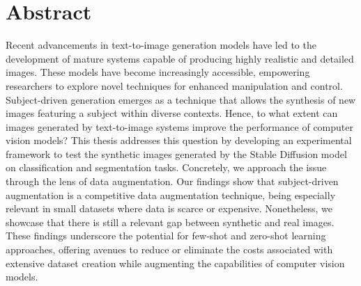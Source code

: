 \section*{Abstract}

Recent advancements in text-to-image generation models have led to the development of mature systems capable of producing highly realistic and detailed images. These models have become increasingly accessible, empowering researchers to explore novel techniques for enhanced manipulation and control. Subject-driven generation emerges as a technique that allows the synthesis of new images featuring a subject within diverse contexts. Hence, to what extent can images generated by text-to-image systems improve the performance of computer vision models? This thesis addresses this question by developing an experimental framework to test the synthetic images generated by the Stable Diffusion model on classification and segmentation tasks. Concretely, we approach the issue through the lens of data augmentation. Our findings show that subject-driven augmentation is a competitive data augmentation technique, being especially relevant in small datasets where data is scarce or expensive. Nonetheless, we showcase that there is still a relevant gap between synthetic and real images. These findings underscore the potential for few-shot and zero-shot learning approaches, offering avenues to reduce or eliminate the costs associated with extensive dataset creation while augmenting the capabilities of computer vision models.